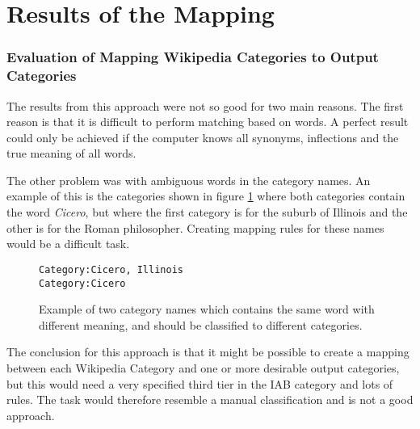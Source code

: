 \section{Results of the Mapping}
\subsubsection{Evaluation of Mapping Wikipedia Categories to Output Categories}
The results from this approach were not so good for two main reasons. 
The first reason is that it is difficult to perform matching based on words. A perfect result could only be achieved if the computer knows all synonyms, inflections and the true meaning of all words. 

The other problem was with ambiguous words in the category names. An example of this is the categories shown in figure \ref{fig:ambiguous_category_name} where both categories contain the word \emph{Cicero}, but where the first category is for the suburb of Illinois and the other is for the Roman philosopher. Creating mapping rules for these names would be a difficult task. 

\begin{figure}[h]
\centering
\begin{lstlisting}
Category:Cicero, Illinois
Category:Cicero
\end{lstlisting}
\caption{Example of two category names which contains the same word with different meaning, and should be classified to different categories.}
\label{fig:ambiguous_category_name}
\end{figure}


The conclusion for this approach is that it might be possible to create a mapping between each Wikipedia Category and one or more desirable output categories, but this would need a very specified third tier in the IAB category and lots of rules. The task would therefore resemble a manual classification and is not a good approach. 
